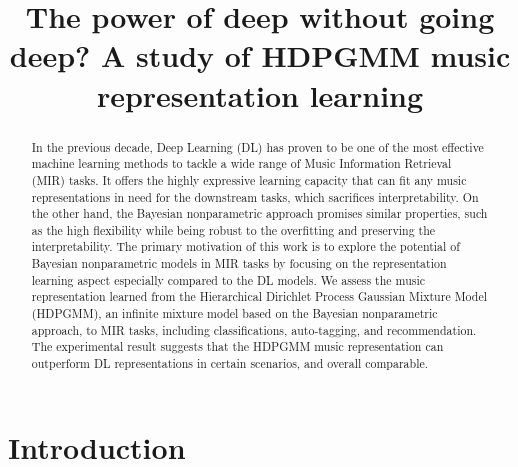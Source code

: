 \documentclass{article}
\title{The power of deep without going deep? A study of HDPGMM music representation learning}
\begin{document}
%
\maketitle
%
\begin{abstract}
    In the previous decade, Deep Learning (DL) has proven to be one of the most effective machine learning methods to tackle a wide range of Music Information Retrieval (MIR) tasks. It offers the highly expressive learning capacity that can fit any music representations in need for the downstream tasks, which sacrifices interpretability.
    On the other hand, the Bayesian nonparametric approach promises similar properties, such as the high flexibility while being robust to the overfitting and preserving the interpretability. The primary motivation of this work is to explore the potential of Bayesian nonparametric models in MIR tasks by focusing on the representation learning aspect especially compared to the DL models.
    We assess the music representation learned from the Hierarchical Dirichlet Process Gaussian Mixture Model (HDPGMM), an infinite mixture model based on the Bayesian nonparametric approach, to MIR tasks, including classifications, auto-tagging, and recommendation.
    The experimental result suggests that the HDPGMM music representation can outperform DL representations in certain scenarios, and overall comparable.
\end{abstract}
%
\section{Introduction}\label{sec:introduction}

\end{document}
